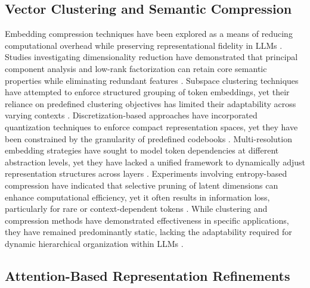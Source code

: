 \subsection{Vector Clustering and Semantic Compression}

Embedding compression techniques have been explored as a means of reducing computational overhead while preserving representational fidelity in LLMs \cite{hartsuikerfinetuning}. Studies investigating dimensionality reduction have demonstrated that principal component analysis and low-rank factorization can retain core semantic properties while eliminating redundant features \cite{satterfield2024fine}. Subspace clustering techniques have attempted to enforce structured grouping of token embeddings, yet their reliance on predefined clustering objectives has limited their adaptability across varying contexts \cite{racus2024dynamic}. Discretization-based approaches have incorporated quantization techniques to enforce compact representation spaces, yet they have been constrained by the granularity of predefined codebooks \cite{potkins2024improve}. Multi-resolution embedding strategies have sought to model token dependencies at different abstraction levels, yet they have lacked a unified framework to dynamically adjust representation structures across layers \cite{eamen2024neural}. Experiments involving entropy-based compression have indicated that selective pruning of latent dimensions can enhance computational efficiency, yet it often results in information loss, particularly for rare or context-dependent tokens \cite{mcintosh2024inadequacies}. While clustering and compression methods have demonstrated effectiveness in specific applications, they have remained predominantly static, lacking the adaptability required for dynamic hierarchical organization within LLMs \cite{zahedi2024conversational}.

\subsection{Attention-Based Representation Refinements}

